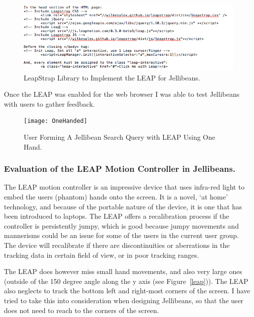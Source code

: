 \documentclass[a4paper, 11pt]{article}
\begin{document}
\begin{figure}[H]
\begin{center}
\includegraphics[scale=0.60]{leapstrap}
\caption{LeapStrap Library to Implement the LEAP for Jellibeans.}
\label{leapstrap}
\end{center}
\end{figure}

Once the LEAP was enabled for the web browser I was able to test Jellibeans with users to gather feedback. 

\begin{figure}[H]
\begin{center}
\texttt{[image: OneHanded]}
\caption{User Forming A Jellibean Search Query with LEAP Using One Hand.}
\label{OneHanded}
\end{center}
\end{figure}

\subsubsection {Evaluation of the LEAP Motion Controller in Jellibeans.}
The LEAP motion controller is an impressive device that uses infra-red light to embed the users (phantom) hands onto the screen. It is a novel, `at home' technology, and because of the portable nature of the device, it is one that has been introduced to laptops. The LEAP offers a recalibration process if the controller is persistently jumpy, which is good because jumpy movements and mannerisms could be an issue for some of the users in the current user group. The device will recalibrate if there are discontinuities or aberrations in the tracking data in certain field of view, or in poor tracking ranges. 

\vspace{5mm}
The LEAP does however miss small hand movements, and also very large ones (outside of the 150 degree angle along the y axis (see Figure~\ref{leap})). The LEAP also neglects to track the bottom left and right-most corners of the screen. I have tried to take this into consideration when designing Jellibeans, so that the user does not need to reach to the corners of the screen.
\end{document}
